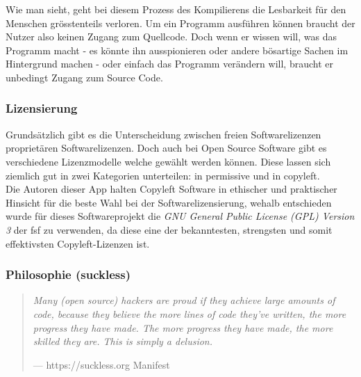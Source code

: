 \documentclass[a4paper,11pt]{article}
\newenvironment{nicequote}[2]{
    \begin{center}\begin{quote}\textit{#1}\\\par\raggedleft--- {#2}
    }{
    \end{quote}\end{center}
}
\begin{document}
Wie man sieht, geht bei diesem Prozess des Kompilierens die Lesbarkeit für den Menschen grösstenteils verloren. Um ein Programm ausführen können braucht der Nutzer also keinen Zugang zum Quellcode. Doch wenn er wissen will, was das Programm macht - es könnte ihn ausspionieren oder andere bösartige Sachen im Hintergrund machen - oder einfach das Programm verändern will, braucht er unbedingt Zugang zum Source Code.\\

\subsubsection{Lizensierung}
Grundsätzlich gibt es die  Unterscheidung zwischen freien Softwarelizenzen proprietären Softwarelizenzen. Doch auch bei Open Source Software gibt es verschiedene Lizenzmodelle welche gewählt werden können. Diese lassen sich ziemlich gut in zwei Kategorien unterteilen: in \gls{permissive} und in \gls{copyleft}.\\

Die Autoren dieser App halten Copyleft Software in ethischer und praktischer Hinsicht für die beste Wahl bei der Softwarelizensierung, wehalb entschieden wurde für dieses Softwareprojekt die \textit{GNU General Public License (GPL) Version 3} \cite{GPLv3} der \gls{fsf} zu verwenden, da diese eine der bekanntesten, strengsten und somit effektivsten Copyleft-Lizenzen ist.

\subsubsection{Philosophie (suckless)}

\begin{nicequote}{Many (open source) hackers are proud if they achieve large amounts of code, because they believe the more lines of code they've written, the more progress they have made. The more progress they have made, the more skilled they are. This is simply a delusion.}{https://suckless.org Manifest \cite{suckless}}
\end{nicequote}

\end{document}
